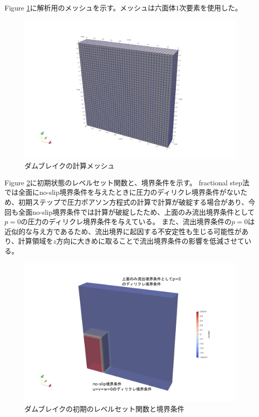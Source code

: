 \documentclass[8pt,a4paper]{article}
\begin{document}
Figure \ref{fig:3d-dambreak-mesh}に解析用のメッシュを示す。メッシュは六面体$1$次要素を使用した。
\begin{figure}[H]
	\centering
	\includegraphics[width=18truecm]{pics/3d-dambreak/mesh.pdf}
	\caption{ダムブレイクの計算メッシュ}
	\label{fig:3d-dambreak-mesh}
\end{figure}

Figure \ref{fig:3d-dambreak-boundary}に初期状態のレベルセット関数と、境界条件を示す。
fractional step法では全面にno-slip境界条件を与えたときに圧力のディリクレ境界条件がないため、初期ステップで圧力ポアソン方程式の計算で計算が破綻する場合があり、今回も全面no-slip境界条件では計算が破綻したため、上面のみ流出境界条件として$p=0$の圧力のディリクレ境界条件を与えている。
また、流出境界条件の$p=0$は近似的な与え方であるため、流出境界に起因する不安定性も生じる可能性があり、計算領域を$z$方向に大きめに取ることで流出境界条件の影響を低減させている。
\begin{figure}[H]
	\centering
	\includegraphics[width=18truecm]{pics/3d-dambreak/levelset_init.pdf}
	\caption{ダムブレイクの初期のレベルセット関数と境界条件}
	\label{fig:3d-dambreak-boundary}
\end{figure}
\end{document}
